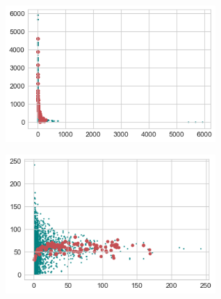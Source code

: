 \begin{figure}[h]
\includegraphics[width=8cm]{img/scatter_1}
\end{figure}

\begin{figure}[h]
\includegraphics[width=8cm]{img/scatter_2}
\end{figure}